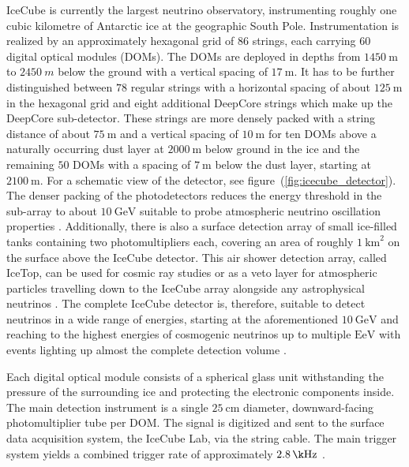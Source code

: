 IceCube is currently the largest neutrino observatory, instrumenting roughly one cubic kilometre of Antarctic ice at the geographic South Pole.
Instrumentation is realized by an approximately hexagonal grid of $\num{86}$ strings, each carrying $\num{60}$ digital optical modules (DOMs).
The DOMs are deployed in depths from $\SI{1450}{\m}$ to $\SI{2450}{m}$ below the ground with a vertical spacing of $\SI{17}{\m}$.
It has to be further distinguished between $\num{78}$ regular strings with a horizontal spacing of about $\SI{125}{\m}$ in the hexagonal grid and eight additional DeepCore strings which make up the DeepCore sub-detector.
These strings are more densely packed with a string distance of about $\SI{75}{\m}$ and a vertical spacing of $\SI{10}{\m}$ for ten DOMs above a naturally occurring dust layer at $\SI{2000}{\m}$ below ground in the ice and the remaining $\num{50}$ DOMs with a spacing of $\SI{7}{\m}$ below the dust layer, starting at $\SI{2100}{\m}$.
For a schematic view of the detector, see figure~(\ref{fig:icecube_detector}).
The denser packing of the photodetectors reduces the energy threshold in the sub-array to about $\SI{10}{\GeV}$ suitable to probe atmospheric neutrino oscillation properties \cite{Aartsen:2016nxy,Wiebusch:2009DeepCore}.
Additionally, there is also a surface detection array of small ice-filled tanks containing two photomultipliers each, covering an area of roughly $\SI{1}{\km\squared}$ on the surface above the IceCube detector.
This air shower detection array, called IceTop, can be used for cosmic ray studies or as a veto layer for atmospheric particles travelling down to the IceCube array alongside any astrophysical neutrinos \cite{IceCube:2012nn}.
The complete IceCube detector is, therefore, suitable to detect neutrinos in a wide range of energies, starting at the aforementioned $\SI{10}{\GeV}$ and reaching to the highest energies of cosmogenic neutrinos up to multiple $\si{\exa\eV}$ with events lighting up almost the complete detection volume \cite{Aartsen:2013dsm}.

Each digital optical module consists of a spherical glass unit withstanding the pressure of the surrounding ice and protecting the electronic components inside.
The main detection instrument is a single $\SI{25}{\cm}$ diameter, downward-facing photomultiplier tube per DOM.
The signal is digitized and sent to the surface data acquisition system, the IceCube Lab, via the string cable.
The main trigger system yields a combined trigger rate of approximately $\SI{2.8}{\k\Hz}$ \cite{Aartsen:2016nxy}.

